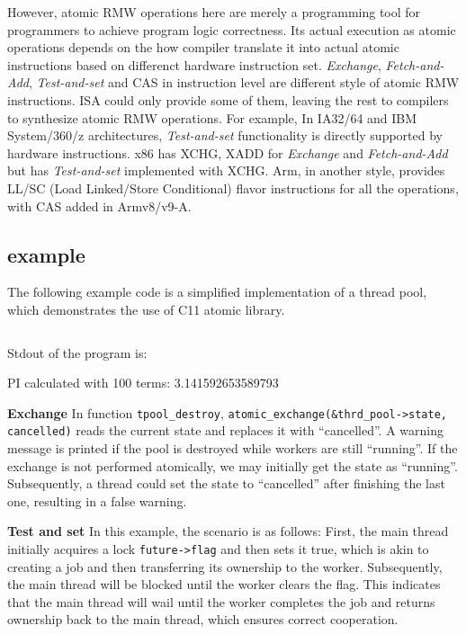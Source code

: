 \documentclass[fontsize=10pt, oneside]{scrartcl}
\newcommand{\monobox}[1]{\mbox{\texttt{#1}}}
\newcommand{\clang}[1]{C#1}
\newcommand{\introduce}[1]{\textit{#1}}
\begin{document}
However, atomic \textsc{RMW} operations here are merely a programming tool for programmers to achieve program logic correctness. 
Its actual execution as atomic operations depends on the how compiler translate it into actual atomic instructions based on differenct hardware instruction set. 
\introduce{Exchange}, \introduce{Fetch-and-Add}, \introduce{Test-and-set} and \textsc{CAS} in instruction level are different style of atomic \textsc{RMW} instructions. 
ISA could only provide some of them, 
leaving the rest to compilers to synthesize atomic \textsc{RMW} operations. 
For example, In IA32/64 and IBM System/360/z architectures, 
\introduce{Test-and-set} functionality is directly supported by hardware instructions. 
x86 has XCHG, XADD for \introduce{Exchange} and \introduce{Fetch-and-Add} but has \introduce{Test-and-set} implemented with XCHG. 
Arm, in another style, provides LL/SC (Load Linked/Store Conditional) flavor instructions for all the operations, 
with \textsc{CAS} added in Armv8/v9-A.

\subsection{example}
\label{rmw_example}
The following example code is a simplified implementation of a thread pool, which demonstrates the use of \clang{}11 atomic library.

\inputminted{c}{./examples/rmw_example.c}

Stdout of the program is:
\begin{ccode}
PI calculated with 100 terms: 3.141592653589793
\end{ccode}

\textbf{Exchange}
In function \monobox{tpool\_destroy}, \monobox{atomic\_exchange(\&thrd\_pool->state, cancelled)} reads the current state and replaces it with ``cancelled''. 
A warning message is printed if the pool is destroyed while workers are still ``running''. 
If the exchange is not performed atomically, we may initially get the state as ``running''. Subsequently, a thread could set the state to ``cancelled'' after finishing the last one, resulting in a false warning.

\textbf{Test and set}
In this example, the scenario is as follows: 
First, the main thread initially acquires a lock \monobox{future->flag} and then sets it true, 
which is akin to creating a job and then transferring its ownership to the worker. 
Subsequently, the main thread will be blocked until the worker clears the flag. 
This indicates that the main thread will wail until the worker completes the job and returns ownership back to the main thread, which ensures correct cooperation.
\end{document}

